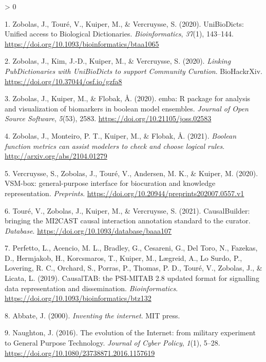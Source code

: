 \documentclass[
  12pt,
]{book}
\newlength{\cslhangindent}
\newenvironment{CSLReferences}[2] %
 {%
  \setlength{\parindent}{0pt}
  \ifodd #1 \everypar{\setlength{\hangindent}{\cslhangindent}}\ignorespaces\fi
  \ifnum #2 > 0
  \setlength{\parskip}{#2\baselineskip}
  \fi
 }%
 {}
\begin{document}
\hypertarget{refs}{}
\begin{CSLReferences}{1}{0}
\leavevmode\hypertarget{ref-UBDs}{}%
1. Zobolas, J., Touré, V., Kuiper, M., \& Vercruysse, S. (2020). {UniBioDicts: Unified access to Biological Dictionaries}. \emph{Bioinformatics}, \emph{37}(1), 143--144. \url{https://doi.org/10.1093/bioinformatics/btaa1065}

\leavevmode\hypertarget{ref-Zobolas2020-pubdict}{}%
2. Zobolas, J., Kim, J.-D., Kuiper, M., \& Vercruysse, S. (2020). \emph{{Linking PubDictionaries with UniBioDicts to support Community Curation}}. BioHackrXiv. \url{https://doi.org/10.37044/osf.io/gzfa8}

\leavevmode\hypertarget{ref-Zobolas2020}{}%
3. Zobolas, J., Kuiper, M., \& Flobak, Å. (2020). {emba: R package for analysis and visualization of biomarkers in boolean model ensembles}. \emph{Journal of Open Source Software}, \emph{5}(53), 2583. \url{https://doi.org/10.21105/joss.02583}

\leavevmode\hypertarget{ref-Zobolas2021-bias}{}%
4. Zobolas, J., Monteiro, P. T., Kuiper, M., \& Flobak, Å. (2021). \emph{{Boolean function metrics can assist modelers to check and choose logical rules}}. \url{http://arxiv.org/abs/2104.01279}

\leavevmode\hypertarget{ref-vsm-box}{}%
5. Vercruysse, S., Zobolas, J., Touré, V., Andersen, M. K., \& Kuiper, M. (2020). {VSM-box: general-purpose interface for biocuration and knowledge representation}. \emph{Preprints}. \url{https://doi.org/10.20944/preprints202007.0557.v1}

\leavevmode\hypertarget{ref-Toure2021}{}%
6. Touré, V., Zobolas, J., Kuiper, M., \& Vercruysse, S. (2021). {CausalBuilder: bringing the MI2CAST causal interaction annotation standard to the curator}. \emph{Database}. \url{https://doi.org/10.1093/database/baaa107}

\leavevmode\hypertarget{ref-Perfetto2019}{}%
7. Perfetto, L., Acencio, M. L., Bradley, G., Cesareni, G., Del Toro, N., Fazekas, D., Hermjakob, H., Korcsmaros, T., Kuiper, M., Lægreid, A., Lo Surdo, P., Lovering, R. C., Orchard, S., Porras, P., Thomas, P. D., Touré, V., Zobolas, J., \& Licata, L. (2019). {CausalTAB: the PSI-MITAB 2.8 updated format for signalling data representation and dissemination}. \emph{Bioinformatics}. \url{https://doi.org/10.1093/bioinformatics/btz132}

\leavevmode\hypertarget{ref-Abbate2000}{}%
8. Abbate, J. (2000). \emph{{Inventing the internet}}. MIT press.

\leavevmode\hypertarget{ref-Naughton2016}{}%
9. Naughton, J. (2016). {The evolution of the Internet: from military experiment to General Purpose Technology}. \emph{Journal of Cyber Policy}, \emph{1}(1), 5--28. \url{https://doi.org/10.1080/23738871.2016.1157619}


\end{CSLReferences}
\end{document}
